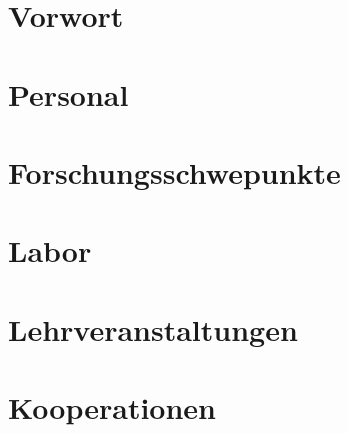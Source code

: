 
\chapter{Vorwort}


\chapter{Personal}





\chapter{Forschungsschwepunkte}


\chapter{Labor}


\chapter{Lehrveranstaltungen}


\chapter{Kooperationen}